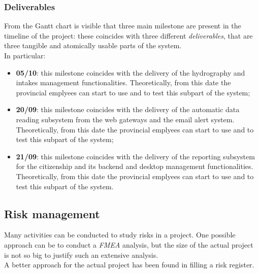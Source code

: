 \subsubsection{Deliverables}
From the Gantt chart is visible that three main milestone are present in the timeline of the project: these coincides with three different \textit{deliverables}, that are three tangible and atomically usable parts of the system.\\
In particular:
\begin{itemize}
    \item \textbf{05/10}: this milestone coincides with the delivery of the hydrography and intakes management functionalities. Theoretically, from this date the provincial emplyees can start to use and to test this subpart of the system;
    \item \textbf{20/09}: this milestone coincides with the delivery of the automatic data reading subsystem from the web gateways and the email alert system. Theoretically, from this date the provincial emplyees can start to use and to test this subpart of the system;
    \item \textbf{21/09}: this milestone coincides with the delivery of the reporting subsystem for the citizenship and its backend and desktop management functionalities. Theoretically, from this date the provincial emplyees can start to use and to test this subpart of the system.
\end{itemize}

\subsection{Risk management}
Many activities can be conducted to study risks in a project. One possible approach can be to conduct a \textit{FMEA} analysis, but the size of the actual project is not so big to justify such an extensive analysis. \\
A better approach for the actual project has been found in filling a risk register.

